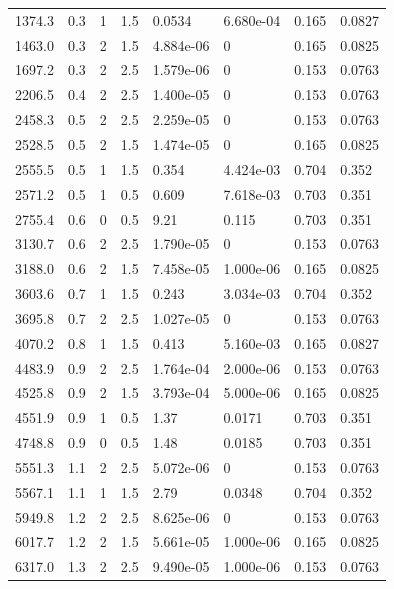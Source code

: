 \documentclass[preview]{standalone}
\begin{document}
{{\begin{tabular}{L{1.2cm}C{1.2cm} C{0.3cm}C{0.5cm} C{1.4cm}C{1.4cm} C{1.4cm}C{1.4cm}}
  1374.3  &   0.3  & 1     & 1.5 &  0.0534  & 6.680e-04  & 0.165 &  0.0827   \\ 
  1463.0  &   0.3  & 2     & 1.5 &  4.884e-06  & 0  & 0.165 &  0.0825   \\ 
  1697.2  &   0.3  & 2     & 2.5 &  1.579e-06  & 0  & 0.153 &  0.0763   \\ 
  2206.5  &   0.4  & 2     & 2.5 &  1.400e-05  & 0  & 0.153 &  0.0763   \\ 
  2458.3  &   0.5  & 2     & 2.5 &  2.259e-05  & 0  & 0.153 &  0.0763   \\ 
  2528.5  &   0.5  & 2     & 1.5 &  1.474e-05  & 0  & 0.165 &  0.0825   \\ 
  2555.5  &   0.5  & 1     & 1.5 &  0.354  & 4.424e-03  & 0.704 &  0.352   \\ 
  2571.2  &   0.5  & 1     & 0.5 &  0.609  & 7.618e-03  & 0.703 &  0.351   \\ 
  2755.4  &   0.6  & 0     & 0.5 &  9.21  & 0.115  & 0.703 &  0.351   \\ 
  3130.7  &   0.6  & 2     & 2.5 &  1.790e-05  & 0  & 0.153 &  0.0763   \\ 
  3188.0  &   0.6  & 2     & 1.5 &  7.458e-05  & 1.000e-06  & 0.165 &  0.0825   \\ 
  3603.6  &   0.7  & 1     & 1.5 &  0.243  & 3.034e-03  & 0.704 &  0.352   \\ 
  3695.8  &   0.7  & 2     & 2.5 &  1.027e-05  & 0  & 0.153 &  0.0763   \\ 
  4070.2  &   0.8  & 1     & 1.5 &  0.413  & 5.160e-03  & 0.165 &  0.0827   \\ 
  4483.9  &   0.9  & 2     & 2.5 &  1.764e-04  & 2.000e-06  & 0.153 &  0.0763   \\ 
  4525.8  &   0.9  & 2     & 1.5 &  3.793e-04  & 5.000e-06  & 0.165 &  0.0825   \\ 
  4551.9  &   0.9  & 1     & 0.5 &  1.37  & 0.0171  & 0.703 &  0.351   \\ 
  4748.8  &   0.9  & 0     & 0.5 &  1.48  & 0.0185  & 0.703 &  0.351   \\ 
  5551.3  &   1.1  & 2     & 2.5 &  5.072e-06  & 0  & 0.153 &  0.0763   \\ 
  5567.1  &   1.1  & 1     & 1.5 &  2.79  & 0.0348  & 0.704 &  0.352   \\ 
  5949.8  &   1.2  & 2     & 2.5 &  8.625e-06  & 0  & 0.153 &  0.0763   \\ 
  6017.7  &   1.2  & 2     & 1.5 &  5.661e-05  & 1.000e-06  & 0.165 &  0.0825   \\ 
  6317.0  &   1.3  & 2     & 2.5 &  9.490e-05  & 1.000e-06  & 0.153 &  0.0763   \\ 

\end{tabular}}}
\end{document}
